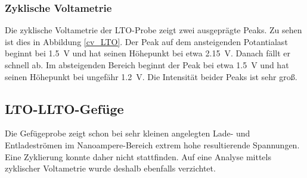 \documentclass[a4paper, 11pt, headsepline,footsepline,twoside,abstract]{scrbook}
\begin{document}
\subsubsection{Zyklische Voltametrie}
Die zyklische Voltametrie der LTO-Probe zeigt zwei ausgeprägte Peaks. Zu sehen ist dies in Abbildung \ref{cv_LTO}. Der Peak auf dem ansteigenden Potantialast beginnt bei \SI{1.5}{\volt} und hat seinen Höhepunkt bei etwa \SI{2.15}{\volt}. Danach fällt er schnell ab. Im absteigenden Bereich beginnt der Peak bei etwa \SI{1.5}{\volt} und hat seinen Höhepunkt bei ungefähr \SI{1.2}{\volt}. Die Intensität beider Peaks ist sehr groß.
\subsection{LTO-LLTO-Gefüge}
Die Gefügeprobe zeigt schon bei sehr kleinen angelegten Lade- und Entladeströmen im Nanoampere-Bereich extrem hohe resultierende Spannungen. Eine Zyklierung konnte daher nicht stattfinden. Auf eine Analyse mittels zyklischer Voltametrie wurde deshalb ebenfalls verzichtet.
\end{document}
